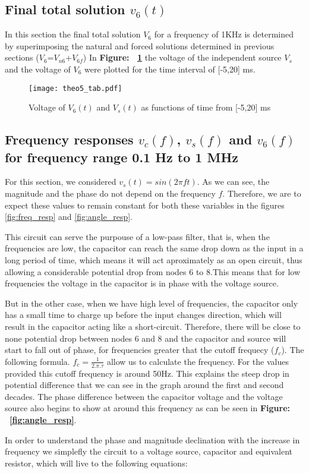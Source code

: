 \pagebreak
\subsection{Final total solution $v_6(t)$}
In this section the final total solution $V_6$ for a frequency of 1KHz is determined by superimposing the natural and forced solutions determined in previous sections ($V_6$=$V_{n6}$+$V_{6f}$) In \textbf{Figure: ~\ref{fig:theo5}} the voltage of the independent source $V_{s}$ and the voltage of $V_{6}$ were plotted for the time interval of [-5,20] ms. 
\begin{figure}[h!] \centering
\texttt{[image: theo5\_tab.pdf]}
\caption{Voltage of $V_{6}(t)$ and $V_{s}(t)$ as functions of time from [-5,20] ms}
\label{fig:theo5}
\end{figure}
\vspace{15cm}


\pagebreak
\subsection{Frequency responses $v_c(f)$, $v_s(f)$ and $v_6(f)$ for frequency range 0.1 Hz to 1 MHz}
\label{ref}
For this section, we considered $v_s( t)  = sin( 2 \pi f t )$. As we can see, the magnitude and the phase do not depend on the frequency $f$. Therefore, we are to expect these values to remain constant for both these variables in the figures \ref{fig:freq_resp} and \ref{fig:angle_resp}.\par 
This circuit can serve the purpouse of a low-pass filter, that is, when the frequencies are low, the capacitor can reach the same drop down as the input in a long period of time, which means
it will act aproximately as an open circuit, thus allowing a considerable potential drop 
from nodes 6 to 8.This means that for low frequencies the voltage in the capacitor
is in phase with the voltage source. \par
But in the other case, when we have high level of frequencies,
the capacitor only has a small time to charge up before the input changes direction, which will result in the capacitor acting like a short-circuit. Therefore, there will be close to none 
potential drop between nodes 6 and 8 and the capacitor and source will start to fall 
out of phase, for frequencies greater that the cutoff frequecy ($f_c$). 
The following formula. $f_c = \frac{1}{2.\pi.\tau}$ allow us to calculate the frequency.  
For the values provided this cutoff frequency is around 50Hz. This explains the steep drop 
in potential difference that we can see in the graph around the first and second decades.
The phase difference between the capacitor voltage and the voltage source also begins to 
show at around this frequency as can be seen in \textbf{Figure: ~\ref{fig:angle_resp}}.\par
In order to understand the phase and magnitude declination with the increase in frequency we simplefly the circuit to a voltage source, capacitor and equivalent resistor, which will live to the following equations:


